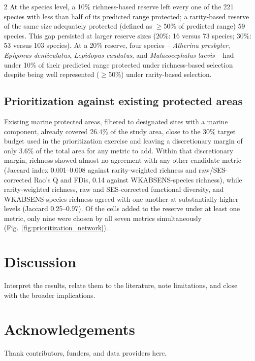 \begin{spacing}{2}
At the species level, a 10\% richness-based reserve left every one of the 221 species with less than half of its predicted range protected; a rarity-based reserve of the same size adequately protected (defined as $\geq$50\% of predicted range) 59 species. This gap persisted at larger reserve sizes (20\%: 16 versus 73 species; 30\%: 53 versus 103 species). At a 20\% reserve, four species -- \textit{Atherina presbyter}, \textit{Epigonus denticulatus}, \textit{Lepidopus caudatus}, and \textit{Malacocephalus laevis} -- had under 10\% of their predicted range protected under richness-based selection despite being well represented ($\geq$50\%) under rarity-based selection.

\subsection{Prioritization against existing protected areas}
Existing marine protected areas, filtered to designated sites with a marine component, already covered 26.4\% of the study area, close to the 30\% target budget used in the prioritization exercise and leaving a discretionary margin of only 3.6\% of the total area for any metric to add. Within that discretionary margin, richness showed almost no agreement with any other candidate metric (Jaccard index 0.001--0.008 against rarity-weighted richness and raw/SES-corrected Rao's Q and FDis, 0.14 against WKABSENS-species richness), while rarity-weighted richness, raw and SES-corrected functional diversity, and WKABSENS-species richness agreed with one another at substantially higher levels (Jaccard 0.25--0.97). Of the cells added to the reserve under at least one metric, only nine were chosen by all seven metrics simultaneously (Fig.~\ref{fig:prioritization_network}).

\section{Discussion}
Interpret the results, relate them to the literature, note limitations, and
close with the broader implications.

\section{Acknowledgements}
Thank contributors, funders, and data providers here.


\end{spacing}
